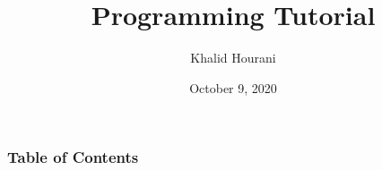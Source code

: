 \documentclass{beamer}
\title{Programming Tutorial}
\author{Khalid Hourani}
\date{October 9, 2020}
\institute{University of Houston}
\begin{document}
\frame{\titlepage}

\begin{frame}
    \frametitle{Table of Contents}
    \tableofcontents
\end{frame}




\end{document}
